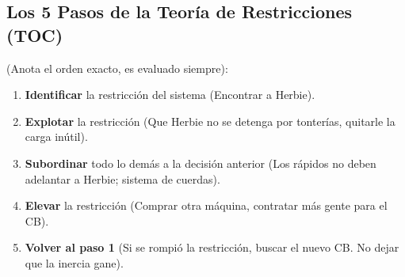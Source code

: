 \subsection{Los 5 Pasos de la Teoría de Restricciones (TOC)}
(Anota el orden exacto, es evaluado siempre):
\begin{enumerate}
    \item \textbf{Identificar} la restricción del sistema (Encontrar a Herbie).
    \item \textbf{Explotar} la restricción (Que Herbie no se detenga por tonterías, quitarle la carga inútil).
    \item \textbf{Subordinar} todo lo demás a la decisión anterior (Los rápidos no deben adelantar a Herbie; sistema de cuerdas).
    \item \textbf{Elevar} la restricción (Comprar otra máquina, contratar más gente para el CB).
    \item \textbf{Volver al paso 1} (Si se rompió la restricción, buscar el nuevo CB. No dejar que la inercia gane).
\end{enumerate}
